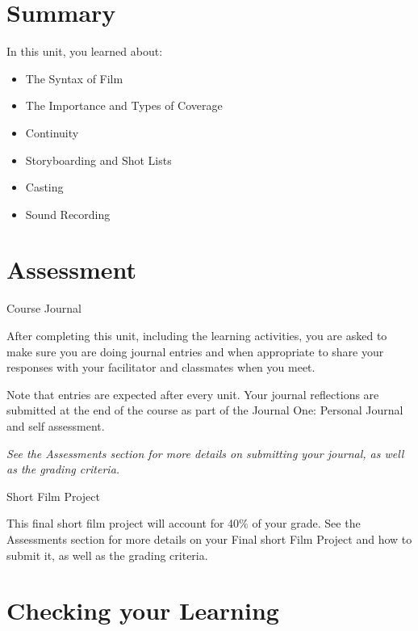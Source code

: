 \documentclass[
]{book}
\providecommand{\tightlist}{%
  \setlength{\itemsep}{0pt}\setlength{\parskip}{0pt}}
\begin{document}
\hypertarget{summary-8}{%
\section*{Summary}\label{summary-8}}

In this unit, you learned about:

\begin{itemize}
\tightlist
\item
  The Syntax of Film\\
\item
  The Importance and Types of Coverage\\
\item
  Continuity\\
\item
  Storyboarding and Shot Lists\\
\item
  Casting\\
\item
  Sound Recording
\end{itemize}

\hypertarget{assessment-17}{%
\section*{Assessment}\label{assessment-17}}

\begin{assessment}
{Course Journal}

After completing this unit, including the learning activities, you are asked to make sure you are doing journal entries and when appropriate to share your responses with your facilitator and classmates when you meet.

Note that entries are expected after every unit. Your journal reflections are submitted at the end of the course as part of the Journal One: Personal Journal and self assessment.

\emph{See the Assessments section for more details on submitting your journal, as well as the grading criteria.}

{Short Film Project }

This final short film project will account for 40\% of your grade. See the Assessments section for more details on your Final short Film Project and how to submit it, as well as the grading criteria.
\end{assessment}

\hypertarget{checking-your-learning-8}{%
\section*{Checking your Learning}\label{checking-your-learning-8}}
\end{document}
